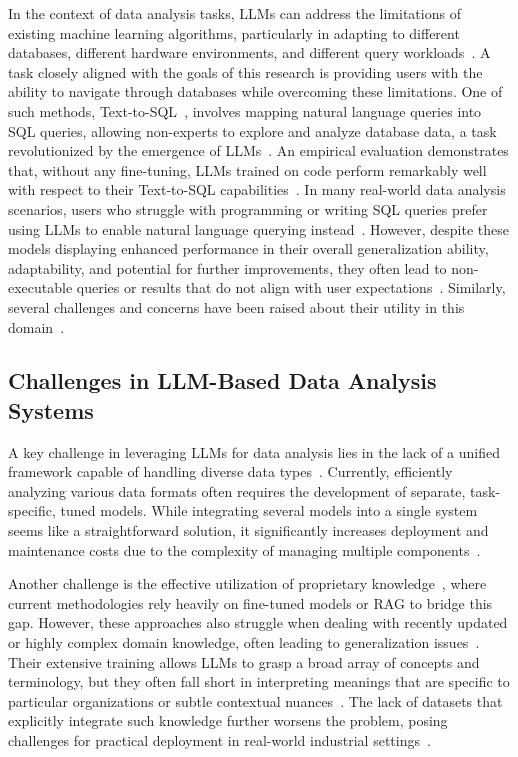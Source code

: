 \documentclass{DESSThesis}
\begin{document}
In the context of data analysis tasks, LLMs can address the limitations of existing machine learning algorithms, particularly in adapting to different databases, different hardware environments, and different query workloads~\cite{zhou2024llmenhanceddatamanagement,10.14778/3685800.3685838}. A task closely aligned with the goals of this research is providing users with the ability to navigate through databases while overcoming these limitations.  One of such methods, Text-to-SQL~\cite{rajkumar2022evaluatingtexttosqlcapabilitieslarge}, involves mapping natural language queries into SQL queries, allowing non-experts to explore and analyze database data, a task revolutionized by the emergence of LLMs~\cite{10.1145/3737873}. An empirical evaluation demonstrates that, without any fine-tuning, LLMs trained on code perform remarkably well with respect to their Text-to-SQL capabilities~\cite{rajkumar2022evaluatingtexttosqlcapabilitieslarge}. In many real-world data analysis scenarios, users who struggle with programming or writing SQL queries prefer using LLMs to enable natural language querying instead~\cite{zhou2024llmenhanceddatamanagement}. However, despite these models displaying enhanced performance in their overall generalization ability, adaptability, and potential for further improvements, they often lead to non-executable queries or results that do not align with user expectations~\cite{zhou2024llmenhanceddatamanagement}. Similarly, several challenges and concerns have been raised about their utility in this domain~\cite{10.1145/3737873}.

\subsection{Challenges in LLM-Based Data Analysis Systems}

A key challenge in leveraging LLMs for data analysis lies in the lack of a unified framework capable of handling diverse data types~\cite{zhou2025surveyllmtimesdata,zhou2024llmenhanceddatamanagement}. Currently, efficiently analyzing various data formats often requires the development of separate, task-specific, tuned models. While integrating several models into a single system seems like a straightforward solution, it significantly increases deployment and maintenance costs due to the complexity of managing multiple components~\cite{zhou2025surveyllmtimesdata}.

Another challenge is the effective utilization of proprietary knowledge~\cite{zhou2025surveyllmtimesdata,10.1145/3613905.3651042,10.1145/3737873}, where current methodologies rely heavily on fine-tuned models or RAG to bridge this gap. However, these approaches also struggle when dealing with recently updated or highly complex domain knowledge, often leading to generalization issues~\cite{zhou2025surveyllmtimesdata}. Their extensive training allows LLMs to grasp a broad array of concepts and terminology, but they often fall short in interpreting meanings that are specific to particular organizations or subtle contextual nuances~\cite{10.1145/3613905.3651042}. The lack of datasets that explicitly integrate such knowledge further worsens the problem, posing challenges for practical deployment in real-world industrial settings~\cite{zhou2025surveyllmtimesdata}. 
\end{document}
